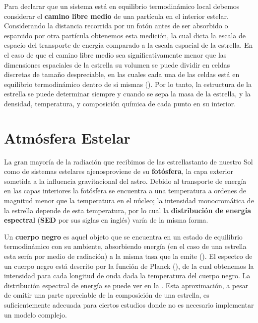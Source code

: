 Para declarar que un sistema está en equilibrio termodinámico local debemos
considerar el \textbf{camino libre medio} de una partícula en el interior
estelar. Considerando la distancia recorrida por un fotón antes de ser absorbido
o esparcido por otra partícula obtenemos esta medición, la cual dicta la escala
de espacio del transporte de energía comparado a la escala espacial de la
estrella. En el caso de que el camino libre medio sea significativamente menor
que las dimensiones espaciales de la estrella su volumen se puede dividir en
celdas discretas de tamaño despreciable, en las cuales cada una de las celdas
está en equilibrio termodinámico dentro de si mismas
(). Por lo tanto, la
estructura de la estrella se puede determinar siempre y cuando se sepa la masa
de la estrella, y la densidad, temperatura, y composición química de cada punto
en su interior.

\section{Atmósfera Estelar}

La gran mayoría de la radiación que recibimos de las estrellas\textemdash tanto
de nuestro Sol como de sistemas estelares ajenos\textemdash proviene de su
\textbf{fotósfera}, la capa exterior sometida a la influencia gravitacional del
astro. Debido al transporte de energía en las capas interiores la fotósfera
se encuentra a una temperatura a ordenes de magnitud menor que la temperatura en
el núcleo; la intensidad monocromática de la estrella depende de esta
temperatura, por lo cual la \textbf{distribución de energía espectral}
(\textbf{SED} por sus siglas en inglés) varía de la misma forma.

Un \textbf{cuerpo negro} es aquel objeto que se encuentra en un estado de
equilibrio termodinámico con su ambiente, absorbiendo energía (en el caso de una
estrella esta sería por medio de radiación) a la misma tasa que la emite
(). El espectro de un cuerpo
negro está descrito por la función de Planck
(), de la cual obtenemos la intensidad para
cada longitud de onda dada la temperatura del cuerpo negro. La distribución
espectral de energía se puede ver en la .
Esta aproximación, a pesar de omitir una parte apreciable de la composición de
una estrella, es suficientemente adecuada para ciertos estudios donde no es
necesario implementar un modelo complejo.

